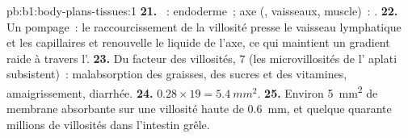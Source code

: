 \begin{solution}{pb:b1:body-plans-tissues:1}
\textbf{21.} ~: endoderme~; axe (, vaisseaux,
muscle)~: .
\textbf{22.} Un pompage~: le raccourcissement de la villosité presse le
vaisseau lymphatique et les capillaires et renouvelle le liquide de
l'axe, ce qui maintient un gradient raide à travers l'.
\textbf{23.} Du facteur des villosités, $7$ (les microvillosités de
l' aplati subsistent)~: malabsorption des graisses, des
sucres et des vitamines, amaigrissement, diarrhée.
\textbf{24.} $0.28\times 19 = \qty{5.4}{mm^2}$.
\textbf{25.} Environ \qty{5}{mm^2} de membrane absorbante sur une
villosité haute de \qty{0.6}{mm}, et quelque quarante millions de
villosités dans l'intestin grêle.
\end{solution}
